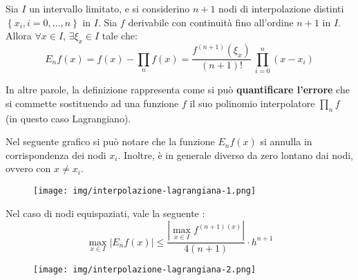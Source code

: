 \begin{definitionbox}
	Sia $I$ un intervallo limitato, e si considerino $n+1$ nodi di interpolazione distinti $\left\{x_{i}, i = 0, \dots, n\right\}$ in $I$. Sia $f$ derivabile con continuità fino all'ordine $n+1$ in $I$. Allora $\forall x \in I$, $\exists \xi_{x} \in I$ tale che:
	\begin{equation}
		E_{n}f\left(x\right) = f\left(x\right) - \displaystyle\prod_{n} f\left(x\right) = \dfrac{f^{\left(n+1\right)}\left(\xi_{x}\right)}{\left(n+1\right)!} \: \prod_{i=0}^{n} \left(x-x_{i}\right)
	\end{equation}
\end{definitionbox}

\noindent
In altre parole, la definizione rappresenta come si può \textbf{quantificare l'errore} che si commette sostituendo ad una funzione $f$ il suo polinomio interpolatore $\prod_{n}f$ (in questo caso Lagrangiano).

\highspace
Nel seguente grafico si può notare che la funzione $E_{n}f\left(x\right)$ si annulla in corrispondenza dei nodi $x_{i}$. Inoltre, è in generale diverso da zero lontano dai nodi, ovvero con $x \ne x_{i}$.

\begin{figure}[!htp]
	\centering
	\texttt{[image: img/interpolazione-lagrangiana-1.png]}
\end{figure}

\noindent
Nel caso di nodi equispaziati, vale la seguente :
\begin{equation}
	\underset{x \in I}{\max} \left|E_{n} f\left(x\right)\right| \le \dfrac{\left|\underset{x \in I}{\max} f^{\left(n+1\right)\left(x\right)}\right|}{4\left(n+1\right)} \cdot h^{n+1}
\end{equation}

\begin{figure}[!htp]
	\centering
	\texttt{[image: img/interpolazione-lagrangiana-2.png]}
\end{figure}